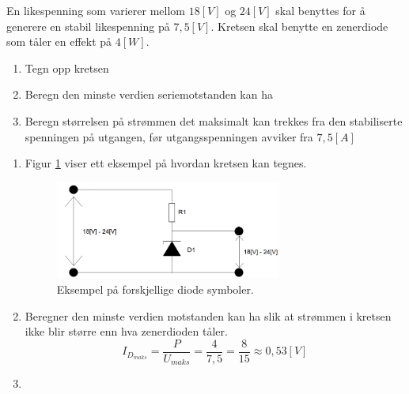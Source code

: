 \begin{question}[name=Oppgave, topic=zenerdioder]
En likespenning som varierer mellom $18 [V]$ og $24 [V]$ skal benyttes for å generere en stabil likespenning på $7,5 [V]$. Kretsen skal benytte en zenerdiode som tåler en effekt på $4 [W]$.

\begin{enumerate}[label=\roman*]
	\item Tegn opp kretsen
	\item Beregn den minste verdien seriemotstanden kan ha
	\item Beregn størrelsen på strømmen det maksimalt kan trekkes fra den stabiliserte spenningen på utgangen, før utgangsspenningen avviker fra $7,5 [A]$
\end{enumerate}
\end{question}

\vspace{0.5cm} %

\begin{solution}[name=Løsningsforslag oppgave]
\begin{enumerate}[label=\roman*]
	\item Figur \ref{fig:zenKrets1} viser ett eksempel på hvordan kretsen kan tegnes.
		\begin{figure}[H]
			\centering
			\includegraphics[width=0.7\textwidth]{diode/figurer/zenKrets1.png}
			\caption{Eksempel på forskjellige diode symboler.}
			\label{fig:zenKrets1}
		\end{figure}
	\item Beregner den minste verdien motstanden kan ha slik at strømmen i kretsen ikke blir større enn hva zenerdioden tåler.
	\[I_{D_{maks}}=\frac{P}{U_{maks}}=\frac{4}{7,5}=\frac{8}{15}\approx 0,53 [V]\]
	\item 

\end{enumerate}

	
\end{solution}


\begin{question}[name=Oppgave, topic=zenerdioder]
	
\end{question}

